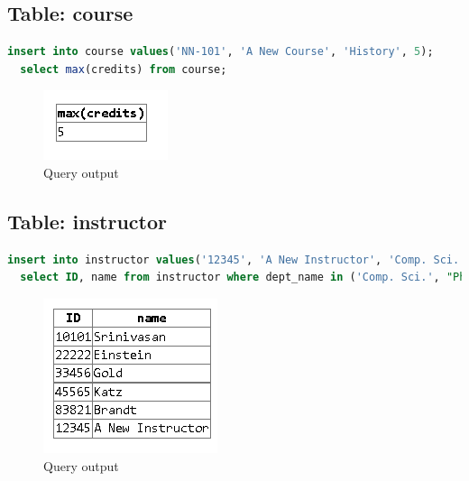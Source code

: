 \documentclass{article}
\begin{document}
\subsection{Table: course}
\begin{lstlisting}[language=sql]
  insert into course values('NN-101', 'A New Course', 'History', 5);
  select max(credits) from course;
\end{lstlisting}
\begin{figure}[!ht]
  \begin{center}
  \includegraphics[scale=1]{course.png}
  \caption{Query output}
  \end{center}
\end{figure}

\subsection{Table: instructor}
\begin{lstlisting}[language=sql]
  insert into instructor values('12345', 'A New Instructor', 'Comp. Sci.', 50000);
  select ID, name from instructor where dept_name in ('Comp. Sci.', "Physics");
\end{lstlisting}
\begin{figure}[!ht]
  \begin{center}
  \includegraphics[scale=0.75]{inst.png}
  \caption{Query output}
  \end{center}
\end{figure}

\newpage
\end{document}
